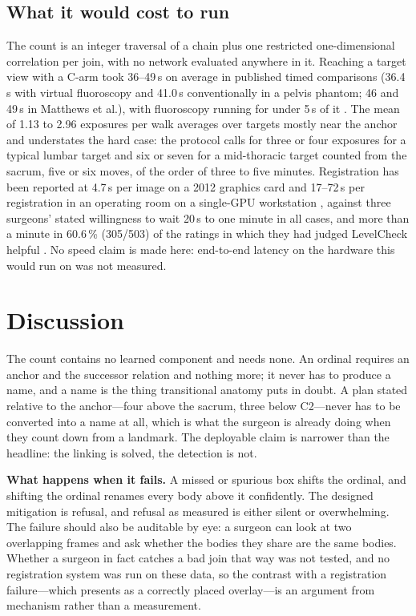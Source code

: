 \documentclass[11pt,letterpaper]{article}
\begin{document}
\subsection*{What it would cost to run}
The count is an integer traversal of a chain plus one restricted one-dimensional correlation per join, with
no network evaluated anywhere in it. Reaching a target view with a C-arm took 36--49\,s on average in
published timed comparisons (36.4\,s with virtual fluoroscopy and 41.0\,s conventionally in a pelvis
phantom; 46 and 49\,s in Matthews et al.), with fluoroscopy running for under 5\,s of it
\citep{matthews2007,desilva2018}. The
mean of 1.13 to 2.96 exposures per walk averages over targets mostly near the anchor and understates the
hard case: the protocol calls for three or four exposures for a typical lumbar target and six or seven for
a mid-thoracic target counted from the sacrum, five or six moves, of the order of three to five minutes.
Registration has been reported at 4.7\,s per image on a 2012 graphics card and 17--72\,s per
registration in an operating room on a single-GPU workstation \citep{levelcheck2012,manbachi2018},
against three surgeons' stated willingness to wait 20\,s to one minute in all cases, and more than a
minute in 60.6\,\% (305/503) of the ratings in which they had judged LevelCheck helpful
\citep{desilva2016}. No speed
claim is made here: end-to-end latency on the hardware this would run on was not measured.

\section*{Discussion}

The count contains no learned component and needs none. An ordinal requires an anchor and the successor
relation and nothing more; it never has to produce a name, and a name is the thing transitional anatomy
puts in doubt. A
plan stated relative to the anchor---four above the sacrum, three below C2---never has to be converted
into a name at all, which is what the surgeon is already doing when they count down from a landmark. The
deployable claim is narrower than the headline: the linking is solved, the detection is not.

\textbf{What happens when it fails.} A missed or spurious box shifts the ordinal, and shifting the ordinal
renames every body above it confidently. The designed mitigation is refusal, and refusal as measured is
either silent or overwhelming. The failure should also be auditable by eye: a surgeon can look at two
overlapping frames and ask whether the bodies they share are the same bodies. Whether a surgeon in fact
catches a bad join that way was not tested, and no registration system was run on these data, so the
contrast with a registration failure---which presents as a correctly placed overlay---is an argument from
mechanism rather than a measurement.
\end{document}
